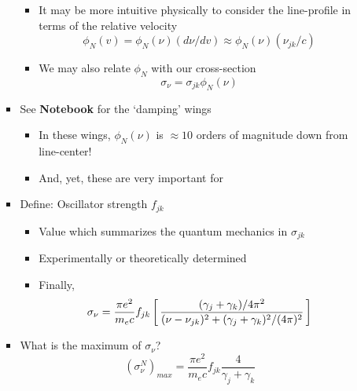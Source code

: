 \documentclass[12pt,letterpaper]{article}
\begin{document}
\begin{Aenumerate}
\begin{itemize}
\begin{itemize}
\begin{itemize}
		\begin{itemize}
		\item It may be more intuitive physically to consider the line-profile
		in terms of the relative velocity
		\begin{equation}
		\phi_N(v) = \phi_N(\nu) (d\nu/dv) \approx \phi_N(\nu) (\nu_{jk}/c)
		\end{equation}
		\item We may also relate $\phi_N$ with our cross-section
		\begin{equation}
		\sigma_\nu = \sigma_{jk} \phi_N(\nu)
		\end{equation}
		\end{itemize}
		\item See {\bf Notebook} for the `damping' wings
			\begin{itemize}
			\item In these wings, $\phi_N(\nu)$ is $\approx 10$ orders of
			magnitude down from line-center!
			\item And, yet, these are very important for \lya
			\end{itemize}
		\item Define: Oscillator strength $f_{jk}$
			\begin{itemize}
			\item Value which summarizes the quantum mechanics in $\sigma_{jk}$
			\item Experimentally or theoretically determined
			\item Finally,
		\begin{equation}
		\sigma_\nu = \frac{\pi e^2}{m_e c} f_{jk} 
		  \left [ \, \frac{(\gamma_j + \gamma_k)/4\pi^2}{(\nu - \nu_{jk})^2
		  + (\gamma_j + \gamma_k)^2 / (4\pi)^2} \, \right ]
		\end{equation}
			\end{itemize}


		\item What is the maximum of $\sigma_\nu$?
		\begin{equation}
		(\sigma_\nu^N)_{max} = \frac{\pi e^2}{m_e c} f_{jk} 
                      \frac{4}{\gamma_j + \gamma_k}
		\end{equation}


\end{itemize}
\end{itemize}
\end{itemize}
\end{Aenumerate}
\end{document}
